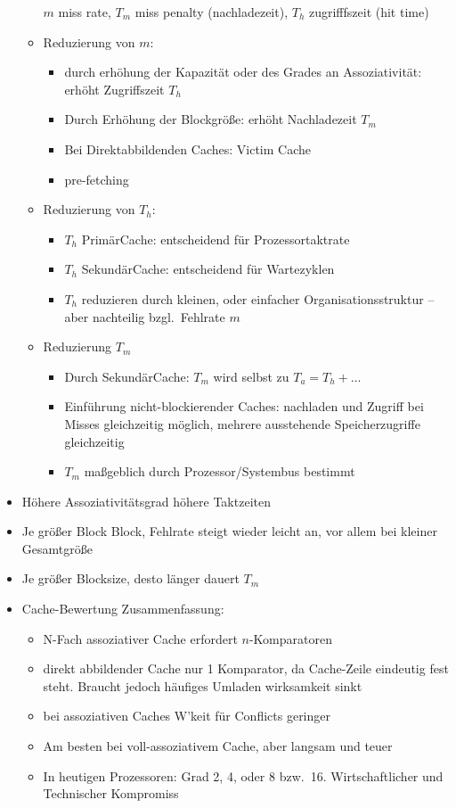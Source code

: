 \begin{itemize}
\begin{itemize}
				$m$ miss rate, $T_m$ miss penalty (nachladezeit), $T_h$ zugrifffszeit (hit time)
			\item
				Reduzierung von $m$:
				\begin{itemize}
					\item
						durch erhöhung der Kapazität oder des Grades an Assoziativität: erhöht Zugriffszeit $T_h$
					\item
						Durch Erhöhung der Blockgröße: erhöht Nachladezeit $T_m$
					\item
						Bei Direktabbildenden Caches: Victim Cache
					\item
						pre-fetching
				\end{itemize}
			\item
				Reduzierung von $T_h$:
				\begin{itemize}
					\item
						$T_h$ PrimärCache: entscheidend für Prozessortaktrate
					\item
						$T_h$ SekundärCache: entscheidend für Wartezyklen
					\item
						$T_h$ reduzieren durch kleinen, oder einfacher Organisationsstruktur -- aber nachteilig bzgl.\ Fehlrate $m$
				\end{itemize}
			\item
				Reduzierung $T_m$
				\begin{itemize}
					\item
						Durch SekundärCache: $T_m$ wird selbst zu $T_a = T_h + \dots$
					\item
						Einführung nicht-blockierender Caches: nachladen und Zugriff bei Misses gleichzeitig möglich, mehrere ausstehende Speicherzugriffe gleichzeitig
					\item
						$T_m$ maßgeblich durch Prozessor/Systembus bestimmt
				\end{itemize}
		\end{itemize}
	\item
		Höhere Assoziativitätsgrad \Ra{} höhere Taktzeiten
	\item
		Je größer Block Block, \Ra{} Fehlrate steigt wieder leicht an, vor allem bei kleiner Gesamtgröße
	\item
		Je größer Blocksize, desto länger dauert $T_m$
	\item
		Cache-Bewertung Zusammenfassung:
		\begin{itemize}
			\item
				N-Fach assoziativer Cache erfordert $n$-Komparatoren
			\item
				direkt abbildender Cache nur 1 Komparator, da Cache-Zeile eindeutig fest steht. Braucht jedoch häufiges Umladen \Ra{} wirksamkeit sinkt
			\item
				bei assoziativen Caches W'keit für Conflicts geringer
			\item
				Am besten bei voll-assoziativem Cache, aber langsam und teuer
			\item
				In heutigen Prozessoren: Grad 2, 4, oder 8 bzw.\ 16. Wirtschaftlicher und Technischer Kompromiss
		\end{itemize}
\end{itemize}
